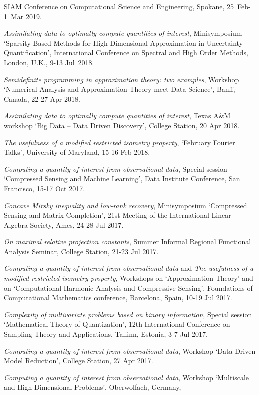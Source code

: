 \documentclass[11pt]{article}
\begin{document}
SIAM Conference on Computational Science and Engineering, Spokane, 25~Feb-1~Mar 2019.
\item {\sl Assimilating data to optimally compute quantities of interest}, Minisymposium `Sparsity-Based \mbox{Methods} for High-Dimensional Approximation in Uncertainty Quantification',
International Conference on Spectral and High Order Methods,
London, U.K., 9-13 Jul~2018.
\item {\sl Semidefinite programming in approximation theory: two examples}, Workshop `Numerical Analysis and Approximation Theory meet Data Science', Banff, Canada, 22-27 Apr 2018.
\item {\sl Assimilating data to optimally compute quantities of interest}, 
Texas A\&M workshop `Big Data -- Data Driven Discovery', 
College Station, 20 Apr 2018.
\item {\sl The usefulness of a modified restricted isometry property}, `February Fourier Talks', University of Maryland, 15-16 Feb 2018.
\item {\sl Computing a quantity of interest from observational data}, 
Special session `Compressed Sensing and Machine Learning', 
Data Institute Conference, San Francisco, 15-17 Oct 2017. 
\item {\sl Concave Mirsky inequality and low-rank recovery}, Minisymposium `Compressed Sensing and Matrix Completion',
21st Meeting of the International Linear Algebra Society, Ames, 24-28 Jul 2017.
\item {\sl On maximal relative projection constants}, Summer Informal Regional Functional Analysis Seminar,
College Station, 21-23 Jul 2017.
\item {\sl Computing a quantity of interest from observational data} and {\sl The usefulness of a modified restricted isometry property}, 
Workshops on `Approximation Theory' and on `Computational Harmonic Analysis and Compressive Sensing',
Foundations of Computational Mathematics conference, 
Barcelona, Spain, 10-19 Jul 2017.
\item {\sl Complexity of multivariate problems based on binary information},
Special session `Mathematical Theory of Quantization',
12th International Conference on Sampling Theory and Applications, 
Tallinn, Estonia, 3-7 Jul 2017.
\item {\sl Computing a quantity of interest from observational data},
Workshop `Data-Driven Model Reduction',
College Station, 27 Apr 2017.
\item {\sl Computing a quantity of interest from observational data},
Workshop `Multiscale and High-Dimensional Problems', Oberwolfach, Germany, 
\end{document}
